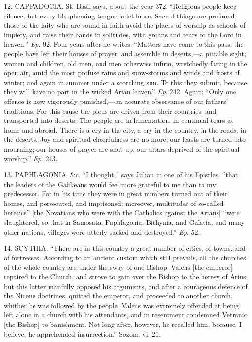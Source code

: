 12. CAPPADOCIA. St. Basil says, about the
year 372: ``Religious people keep silence, but every blaspheming
tongue is let loose. Sacred things are profaned; those of the laity
who are sound in faith avoid the places of worship as schools of
impiety, and raise their hands in solitudes, with groans and tears to
the Lord in heaven.'' \emph{Ep}. 92. Four years after he writes:
``Matters have come to this pass: the people have left their
houses of prayer, and assemble in deserts,—a pitiable sight; women
and children, old men, and men otherwise infirm, wretchedly faring in
the open air, amid the most profuse rains and snow-storms and winds
and frosts of winter; and again in summer under a scorching sun. To
this they submit, because they will have no part in the wicked
Arian leaven.'' \emph{Ep}. 242. Again: ``Only one offence is
now vigorously punished,—an accurate observance of our fathers'
traditions. For this cause the pious are driven from their countries,
and transported into deserts. The people are in lamentation, in
continual tears at home and abroad. There is a cry in the city, a cry
in the country, in the roads, in the deserts. Joy and spiritual
cheerfulness are no more; our feasts are turned into mourning; our
houses of prayer are shut up, our altars deprived of the spiritual
worship.'' \emph{Ep}. 243.

13. PAPHLAGONIA, \&c. ``I
thought,'' says Julian in one of his Epistles, ``that the
leaders of the Galilæans would feel more grateful to me than to my
predecessor. For in his time they were in great numbers turned out of
their homes, and persecuted, and imprisoned; moreover, multitudes of
so-called heretics'' [the Novatians who were with the Catholics
against the Arians] ``were slaughtered, so that in Samosata,
Paphlagonia, Bithynia, and Galatia, and many other nations, villages
were utterly sacked and destroyed.'' \emph{Ep}. 52.

14. SCYTHIA. ``There are in this country
a great number of cities, of towns, and of fortresses. According to an
ancient custom which still prevails, all the churches of the whole
country are under the sway of one Bishop. Valens [the emperor]
repaired to the Church, and strove to gain over the Bishop to the
heresy of Arius; but this latter manfully opposed his arguments, and
after a courageous defence of the Nicene doctrines, quitted the
emperor, and proceeded to another church, whither he was followed by
the people. Valens was extremely offended at being left alone in a
church with his attendants, and in resentment condemned Vetranio [the
Bishop] to banishment. Not long after, however, he recalled him,
because, I believe, he apprehended insurrection.'' Sozom. vi. 21.

